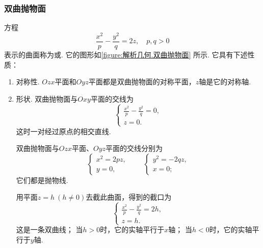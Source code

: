 \subsubsection{双曲抛物面}
方程\begin{equation}\label{equation:解析几何.双曲抛物面的一般方程}
	\frac{x^2}{p}-\frac{y^2}{q}=2z,
	\quad p,q>0
\end{equation}
表示的曲面称为或.
它的图形如\cref{figure:解析几何.双曲抛物面} 所示.
它具有下述性质：
\begin{enumerate}
	\item 对称性.
	\(Ozx\)平面和\(Oyz\)平面都是双曲抛物面的对称平面，\(z\)轴是它的对称轴.

	\item 形状.
	双曲抛物面与\(Oxy\)平面的交线为\[
		\left\{ \begin{array}{l}
			\frac{x^2}{p} - \frac{y^2}{q} = 0, \\
			z = 0.
		\end{array} \right.
	\]
	这时一对经过原点的相交直线.

	双曲抛物面与\(Ozx\)平面、\(Oyz\)平面的交线分别为\[
		\left\{ \begin{array}{l}
			x^2 = 2pz, \\
			y = 0,
		\end{array} \right.
		\qquad
		\left\{ \begin{array}{l}
			y^2 = -2qz, \\
			x = 0;
		\end{array} \right.
	\]
	它们都是抛物线.

	用平面\(z=h\ (h\neq0)\)去截此曲面，得到的截口为\[
		\left\{ \begin{array}{l}
			\frac{x^2}{p} - \frac{y^2}{q} = 2h, \\
			z = h.
		\end{array} \right.
	\]
	这是一条双曲线；
	当\(h>0\)时，它的实轴平行于\(x\)轴；
	当\(h<0\)时，它的实轴平行于\(y\)轴.


\end{enumerate}
